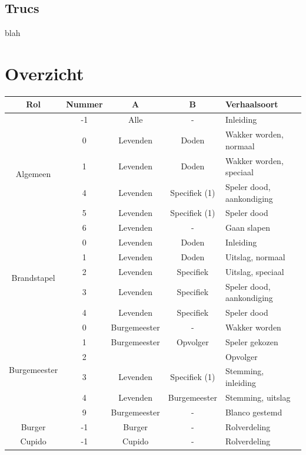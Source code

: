 \documentclass[12pt]{article}
\begin{document}
  \subsection{Trucs}
    
      blah

\section{Overzicht}

  \begin{center}
    \begin{longtable}{c|c|c|c|l}
      Rol & Nummer & A & B &Verhaalsoort \\
      \hline
      \hline
      \multirow{6}{*}{Algemeen} & -1 & Alle & - & Inleiding \\
       & 0 & Levenden & Doden & Wakker worden, normaal \\
       & 1 & Levenden & Doden & Wakker worden, speciaal \\
       & 4 & Levenden & Specifiek (1) & Speler dood, aankondiging \\
       & 5 & Levenden & Specifiek (1) & Speler dood \\
       & 6 & Levenden & - & Gaan slapen \\
      \hline
      \multirow{5}{*}{Brandstapel} & 0 & Levenden & Doden & Inleiding \\
       & 1 & Levenden & Doden & Uitslag, normaal \\
       & 2 & Levenden & Specifiek & Uitslag, speciaal \\
       & 3 & Levenden & Specifiek & Speler dood, aankondiging \\
       & 4 & Levenden & Specifiek & Speler dood \\
      \hline
      \multirow{6}{*}{Burgemeester} & 0 & Burgemeester & - & Wakker worden \\
       & 1 & Burgemeester & Opvolger & Speler gekozen \\
       & 2 & & & Opvolger \\
       & 3 & Levenden & Specifiek (1) & Stemming, inleiding \\
       & 4 & Levenden & Burgemeester & Stemming, uitslag \\
       & 9 & Burgemeester & - & Blanco gestemd \\
      \hline
      \multirow{1}{*}{Burger} & -1 & Burger & - & Rolverdeling \\
      \hline
      \multirow{8}{*}{Cupido} & -1 & Cupido & - & Rolverdeling \\

\end{longtable}
\end{center}
\end{document}
